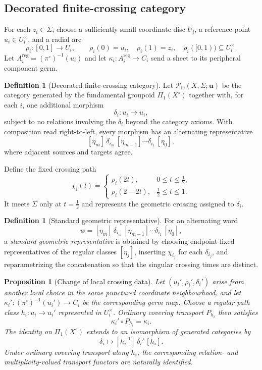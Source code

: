 \documentclass[11pt]{article}
\theoremstyle{plain}
\newtheorem{proposition}[theorem]{Proposition}
\theoremstyle{definition}
\newtheorem{definition}[theorem]{Definition}
\begin{document}
\subsection{Decorated finite-crossing category}
\label{subsec:finite-crossing-category}

For each $z_i\in\Sigma$, choose a sufficiently small coordinate disc $U_i$,
a reference point $u_i\in U_i^\times$, and a radial arc
\[
\rho_i:[0,1]\longrightarrow U_i,
\qquad
\rho_i(0)=u_i,\quad
\rho_i(1)=z_i,\quad
\rho_i([0,1))\subseteq U_i^\times.
\]
Let $A_i^{\mathrm{reg}}=(\pi^\circ)^{-1}(u_i)$ and let
$\kappa_i:A_i^{\mathrm{reg}}\to C_i$ send a sheet to its peripheral
component germ.

\begin{definition}[Decorated finite-crossing category]
\label{def:finite-crossing-category}
Let $\mathcal P_{\mathrm{fc}}(X,\Sigma;\mathbf u)$ be the category generated by
the fundamental groupoid $\Pi_1(X^\circ)$ together with, for each $i$, one
additional morphism
\[
\delta_i:u_i\longrightarrow u_i,
\]
subject to no relations involving the $\delta_i$ beyond the category axioms.
With composition read right-to-left, every morphism has an alternating
representative
\[
[\eta_m]\,\delta_{i_m}\,[\eta_{m-1}]\cdots
\delta_{i_1}\,[\eta_0],
\]
where adjacent sources and targets agree.
\end{definition}

Define the fixed crossing path
\[
\chi_i(t)
=
\begin{cases}
\rho_i(2t),&0\leq t\leq \frac12,\\[1mm]
\rho_i(2-2t),&\frac12\leq t\leq1.
\end{cases}
\]
It meets $\Sigma$ only at $t=\frac12$ and represents the geometric crossing
assigned to $\delta_i$.

\begin{definition}[Standard geometric representative]
\label{def:standard-geometric-representative}
For an alternating word
\[
w=[\eta_m]\,\delta_{i_m}\,[\eta_{m-1}]\cdots
\delta_{i_1}\,[\eta_0],
\]
a \emph{standard geometric representative} is obtained by choosing
endpoint-fixed representatives of the regular classes $[\eta_j]$, inserting
$\chi_{i_j}$ for each $\delta_{i_j}$, and reparametrizing the concatenation
so that the singular crossing times are distinct.
\end{definition}

\begin{proposition}[Change of local crossing data]
\label{prop:change-crossing-data}
Let $(u_i',\rho_i',\delta_i')$ arise from another local choice in the same
punctured coordinate neighbourhood, and let
$\kappa_i':(\pi^\circ)^{-1}(u_i')\to C_i$ be the corresponding germ map.
Choose a regular path class $h_i:u_i\to u_i'$ represented in $U_i^\times$.
Ordinary covering transport $P_{h_i}$ then satisfies
\[
\kappa_i'\circ P_{h_i}=\kappa_i.
\]
The identity on $\Pi_1(X^\circ)$ extends to an isomorphism of generated
categories by
\[
\delta_i\longmapsto
[h_i^{-1}]\,\delta_i'\,[h_i].
\]
Under ordinary covering transport along $h_i$, the corresponding
relation- and multiplicity-valued transport functors are naturally
identified.
\end{proposition}
\end{document}
